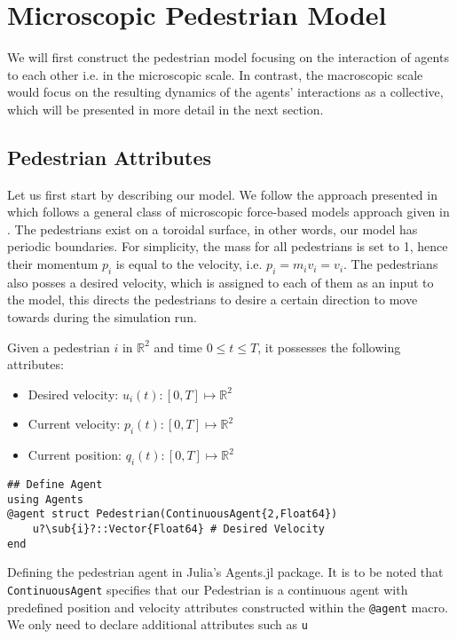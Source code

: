 \section{Microscopic Pedestrian Model}

We will first construct the pedestrian model focusing on the interaction of agents to each other i.e. in the microscopic scale. In contrast, the macroscopic scale would focus on the resulting dynamics of the agents' interactions as a collective, which will be presented in more detail in the next section.

\subsection{Pedestrian Attributes}
Let us first start by describing our model. We follow the approach presented in \cite{tordeux2022multi} which follows a general class of microscopic force-based models approach given in \cite{helbing1995social,chraibi2011force}. The pedestrians exist on a toroidal surface, in other words, our model has periodic boundaries. For simplicity, the mass for all pedestrians is set to 1, hence their momentum $p_i$ is equal to the velocity, i.e. $p_i = m_i v_i = v_i$. The pedestrians also posses a desired velocity, which is assigned to each of them as an input to the model, this directs the pedestrians to desire a certain direction to move towards during the simulation run.

Given a pedestrian $i$ in $\mathbb{R}^2$ and time $0\leq t \leq T$, it possesses the following attributes:
\begin{itemize}
    \item Desired velocity: $u_i(t): [0,T] \mapsto \mathbb{R}^2$ 
    \item Current velocity: $p_i(t): [0,T] \mapsto \mathbb{R}^2$
    \item Current position: $q_i(t): [0,T] \mapsto \mathbb{R}^2$
\end{itemize} 
\begin{listing}[!ht]
\begin{verbatim}
## Define Agent
using Agents
@agent struct Pedestrian(ContinuousAgent{2,Float64})
    u?\sub{i}?::Vector{Float64} # Desired Velocity
end
\end{verbatim}
\caption{Defining the pedestrian agent in Julia's Agents.jl package. It is to be noted that \texttt{ContinuousAgent} specifies that our Pedestrian is a continuous agent with predefined position and velocity attributes constructed within the \texttt{@agent} macro. We only need to declare additional attributes such as \texttt{u}} 
\end{listing}

